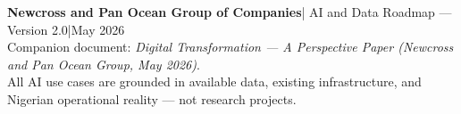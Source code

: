 \documentclass[10pt]{article}
\newcommand{\bigspacer}{\vspace{16pt}}
\begin{document}
\bigspacer

{\small\color{darkgrey}
\textbf{Newcross and Pan Ocean Group of Companies}\enspace|\enspace
AI and Data Roadmap --- Version 2.0\enspace|\enspace May 2026\\
Companion document: \textit{Digital Transformation --- A Perspective Paper
(Newcross and Pan Ocean Group, May 2026)}.\\
All AI use cases are grounded in available data, existing infrastructure,
and Nigerian operational reality --- not research projects.
}
\end{document}
